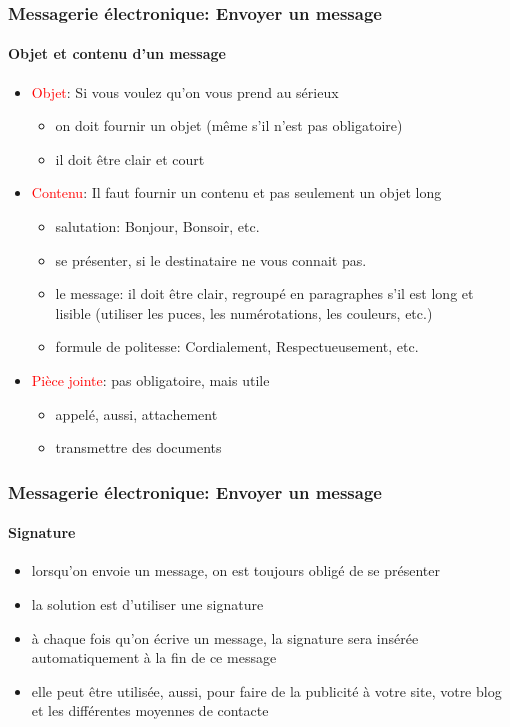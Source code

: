 \documentclass{beamer}
\begin{document}
\begin{frame}
\frametitle{Messagerie électronique: Envoyer un message}
\framesubtitle{Objet et contenu d'un message}

\begin{itemize}
	\item \textcolor{red}{Objet}: Si vous voulez qu'on vous prend au sérieux
	\begin{itemize}
		\item on doit fournir un objet (même s'il n'est pas obligatoire)
		\item il doit être clair et court 
	\end{itemize}
	
	\item \textcolor{red}{Contenu}: Il faut fournir un contenu et pas seulement un objet long 
	\begin{itemize}
		\item salutation: Bonjour, Bonsoir, etc.
		\item se présenter, si le destinataire ne vous connait pas. 
		\item le message: il doit être clair, regroupé en paragraphes s'il est long et lisible (utiliser les puces, les numérotations, les couleurs, etc.)
		\item formule de politesse: Cordialement, Respectueusement, etc.
	\end{itemize}
	
	\item \textcolor{red}{Pièce jointe}: pas obligatoire, mais utile 
	\begin{itemize}
		\item appelé, aussi, attachement
		\item transmettre des documents
	\end{itemize}
	
\end{itemize}

\end{frame}

\begin{frame}
\frametitle{Messagerie électronique: Envoyer un message}
\framesubtitle{Signature}

\begin{itemize}
	\item lorsqu'on envoie un message, on est toujours obligé de se présenter 
	\item la solution est d'utiliser une signature 
	\item à chaque fois qu'on écrive un message, la signature sera insérée automatiquement à la fin de ce message
	\item elle peut être utilisée, aussi, pour faire de la publicité à votre site, votre blog et les différentes moyennes de contacte
\end{itemize}


\end{frame}
\end{document}

